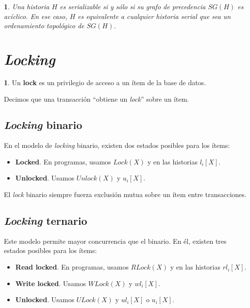 \documentclass[english]{article}
\newtheorem{thm}{\protect\theoremname}
\theoremstyle{definition}
\theoremstyle{definition}
\newtheorem*{defn*}{\protect\definitionname}
\providecommand{\definitionname}{Definición}
\providecommand{\theoremname}{Teorema}
\begin{document}
\begin{thm}
Una historia $H$ es serializable si y sólo si su grafo de precedencia $SG(H)$
es acíclico. En ese caso, $H$ es equivalente a cualquier historia serial que
sea un ordenamiento topológico de $SG(H)$.
\end{thm}

\section{\emph{Locking}}

\begin{defn*}
Un \textbf{lock} es un privilegio de acceso a un ítem de la base de datos.
\end{defn*}

Decimos que una transacción ``obtiene un \emph{lock}'' sobre un ítem.

\subsection{\emph{Locking} binario}

En el modelo de \emph{locking} binario, existen dos estados posibles para los
ítems:

\begin{itemize}
    \item \textbf{Locked}. En programas, usamos $Lock(X)$ y en las historias
        $l_i[X]$.
    \item \textbf{Unlocked}. Usamos $Unlock(X)$ y $u_i[X]$.
\end{itemize}

El \emph{lock} binario siempre fuerza exclusión mutua sobre un ítem entre
transacciones.

\subsection{\emph{Locking} ternario}

Este modelo permite mayor concurrencia que el binario. En él, existen tres
estados posibles para los ítems:

\begin{itemize}
    \item \textbf{Read locked}. En programas, usamos $RLock(X)$ y en las
        historias $rl_i[X]$.
    \item \textbf{Write locked}. Usamos $WLock(X)$ y $wl_i[X]$.
    \item \textbf{Unlocked}. Usamos $ULock(X)$ y $ul_i[X]$ o $u_i[X]$.
\end{itemize}
\end{document}
